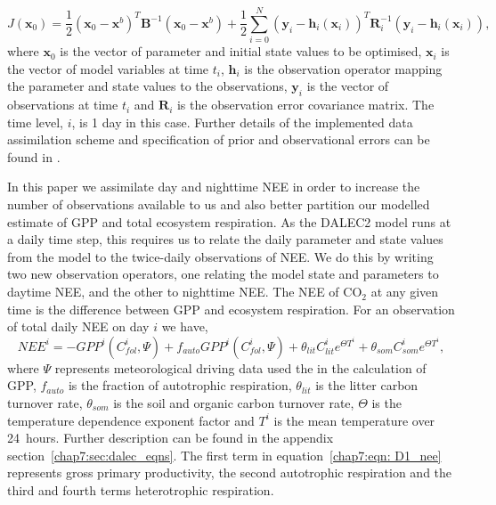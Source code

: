 \begin{equation}
J(\textbf{x}_0) = \frac{1}{2}(\textbf{x}_0-\textbf{x}^b)^{T}\textbf{B}^{-1}(\textbf{x}_0-\textbf{x}^b)+\frac{1}{2}\sum_{i=0}^{N}(\textbf{y}_i-\textbf{h}_i(\textbf{x}_i))^{T}\textbf{R}_{i}^{-1}(\textbf{y}_i-\textbf{h}_i(\textbf{x}_i)),
\end{equation}
where $\textbf{x}_{0}$ is the vector of parameter and initial state values to be optimised, $\textbf{x}_{i}$ is the vector of model variables at time \(t_{i}\), $\textbf{h}_{i}$ is the observation operator mapping the parameter and state values to the observations, $\textbf{y}_{i}$ is the vector of observations at time \(t_i\) and $\textbf{R}_{i}$ is the observation error covariance matrix. The time level, \(i\), is 1 day in this case. Further details of the implemented data assimilation scheme and specification of prior and observational errors can be found in \citet{Pinnington2016299}. 

In this paper we assimilate day and nighttime NEE in order to increase the number of observations available to us and also better partition our modelled estimate of GPP and total ecosystem respiration. As the DALEC2 model runs at a daily time step, this requires us to relate the daily parameter and state values from the model to the twice-daily observations of NEE. We do this by writing two new observation operators, one relating the model state and parameters to daytime NEE, and the other to nighttime NEE. The NEE of CO\(_{2}\) at any given time is the difference between GPP and ecosystem respiration. For an observation of total daily NEE on day \(i\) we have,
\begin{equation}
NEE^{i}=-GPP^{i}(C_{fol}^{i}, \Psi) +f_{auto}GPP^{i}(C_{fol}^{i}, \Psi) + \theta_{lit}C_{lit}^i e^{\Theta T^{i}} + \theta_{som}C_{som}^i e^{\Theta T^{i}}, \label{chap7:eqn: D1_nee}
\end{equation}
where \(\Psi\) represents meteorological driving data used the in the calculation of GPP, \(f_{auto}\) is the fraction of autotrophic respiration, \(\theta_{lit}\) is the litter carbon turnover rate, \(\theta_{som}\) is the soil and organic carbon turnover rate, \(\Theta\) is the temperature dependence exponent factor and \(T^{i}\) is the mean temperature over 24~hours. Further description can be found in the appendix section~\ref{chap7:sec:dalec_eqns}. The first term in equation~\eqref{chap7:eqn: D1_nee} represents gross primary productivity, the second autotrophic respiration and the third and fourth terms heterotrophic respiration. 

